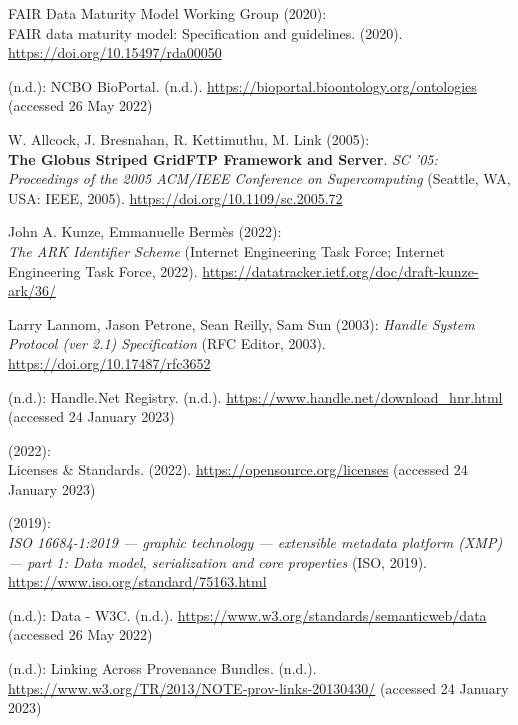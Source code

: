 \begin{thebibliography}{9}
FAIR Data Maturity Model Working Group (2020): \\
{FAIR} data maturity
model: {Specification} and guidelines. (2020).
\url{https://doi.org/10.15497/rda00050}

(n.d.): {NCBO BioPortal}. (n.d.).
\url{https://bioportal.bioontology.org/ontologies} (accessed 26 May
2022)

W. Allcock, J. Bresnahan, R. Kettimuthu, M. Link (2005): \\
\textbf{The
{Globus Striped GridFTP Framework} and {Server}}. \emph{{SC '05:
Proceedings of the 2005 ACM/IEEE Conference on Supercomputing}}
({Seattle, WA, USA}: {IEEE}, 2005).
\url{https://doi.org/10.1109/sc.2005.72}

John A. Kunze, Emmanuelle Bermès (2022): \\
\emph{{The ARK Identifier
Scheme}} (Internet Engineering Task Force; Internet Engineering Task
Force, 2022). \url{https://datatracker.ietf.org/doc/draft-kunze-ark/36/}

Larry Lannom, Jason Petrone, Sean Reilly, Sam Sun (2003):
\emph{Handle {System Protocol} (ver 2.1) {Specification}} ({RFC Editor},
2003).
\url{https://doi.org/10.17487/rfc3652}

(n.d.): Handle.{Net Registry}. (n.d.).
\url{https://www.handle.net/download_hnr.html} (accessed 24 January
2023)

(2022): \\
Licenses \& {Standards}. (2022).
\url{https://opensource.org/licenses} (accessed 24 January 2023)

(2019): \\
\emph{{ISO} 16684-1:2019 --- graphic technology --- extensible
metadata platform (XMP) --- part 1: Data model, serialization and core
properties} ({ISO}, 2019). \url{https://www.iso.org/standard/75163.html}

(n.d.): Data - {W3C}. (n.d.).
\url{https://www.w3.org/standards/semanticweb/data} (accessed 26 May
2022)

(n.d.): Linking {Across Provenance Bundles}. (n.d.).
\url{https://www.w3.org/TR/2013/NOTE-prov-links-20130430/} (accessed 24
January 2023)


\end{thebibliography}
